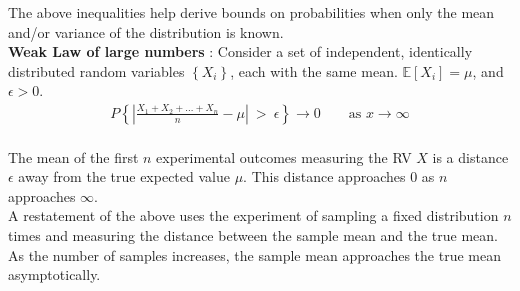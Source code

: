 The above inequalities help derive bounds on probabilities when only the mean and/or variance of the distribution is known. \\

\textbf{Weak Law of large numbers} : Consider a set of independent, identically distributed random variables $ \left\{X_i\right\} $, each with the same mean. $ \mathbb{E}[X_i] = \mu $, and $ \epsilon > 0 $.\\

\begin{align}
	P \left\{ \left| \frac{ X_1 + X_2 + \dots + X_n }{n} - \mu \right|\  >\ \epsilon \right\} \to 0 \qquad
	\text{as } x \to \infty
\end{align} \\

The mean of the first $ n $ experimental outcomes measuring the RV $ X $ is a distance $ \epsilon $ away from the true expected value $ \mu $. This distance approaches $ 0 $ as $ n $ approaches $ \infty $.\\

A restatement of the above uses the experiment of sampling a fixed distribution $ n $ times and measuring the distance between the sample mean and the true mean. As the number of samples increases, the sample mean approaches the true mean asymptotically.
\newpage
